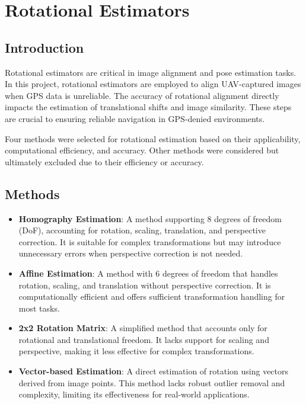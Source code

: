 




\section{Rotational Estimators}

\subsection{Introduction}
Rotational estimators are critical in image alignment and pose estimation tasks. In this project, rotational estimators are employed to align UAV-captured images when GPS data is unreliable. The accuracy of rotational alignment directly impacts the estimation of translational shifts and image similarity. These steps are crucial to ensuring reliable navigation in GPS-denied environments.

Four methods were selected for rotational estimation based on their applicability, computational efficiency, and accuracy. Other methods were considered but ultimately excluded due to their efficiency or accuracy.   

\subsection{Methods}
\begin{itemize}
    \item \textbf{Homography Estimation}: A method supporting 8 degrees of freedom (DoF), accounting for rotation, scaling, translation, and perspective correction. It is suitable for complex transformations but may introduce unnecessary errors when perspective correction is not needed.
    \item \textbf{Affine Estimation}: A method with 6 degrees of freedom that handles rotation, scaling, and translation without perspective correction. It is computationally efficient and offers sufficient transformation handling for most tasks.
    \item \textbf{2x2 Rotation Matrix}: A simplified method that accounts only for rotational and translational freedom. It lacks support for scaling and perspective, making it less effective for complex transformations.
    \item \textbf{Vector-based Estimation}: A direct estimation of rotation using vectors derived from image points. This method lacks robust outlier removal and complexity, limiting its effectiveness for real-world applications.
\end{itemize}


